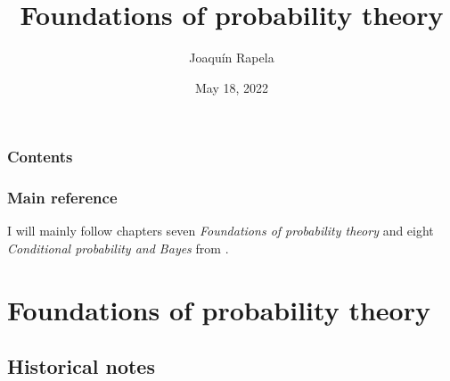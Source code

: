 \title{Foundations of probability theory}

\author{Joaqu\'{i}n Rapela} %
\date{May 18, 2022} %




\begin{frame}
\titlepage %
\end{frame}

\begin{frame}
\frametitle{Contents} %
\tableofcontents %
\end{frame}

\begin{frame}
\frametitle{Main reference} %

    I will mainly follow chapters seven \textit{Foundations of probability
    theory} and eight \textit{Conditional probability and Bayes} from
    \citet{tijms12}.

\end{frame}

\section{Foundations of probability theory}

\subsection{Historical notes}

